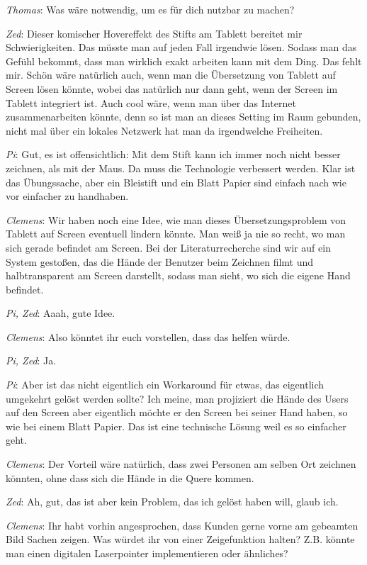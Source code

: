 \medskip \emph{Thomas}: Was wäre notwendig, um es für dich nutzbar zu machen?

\medskip \emph{Zed}: Dieser komischer Hovereffekt des Stifts am Tablett bereitet mir Schwierigkeiten. Das müsste man auf jeden Fall irgendwie lösen. Sodass man das Gefühl bekommt, dass man wirklich exakt arbeiten kann mit dem Ding. Das fehlt mir. Schön wäre natürlich auch, wenn man die Übersetzung von Tablett auf Screen lösen könnte, wobei das natürlich nur dann geht, wenn der Screen im Tablett integriert ist. Auch cool wäre, wenn man über das Internet zusammenarbeiten könnte, denn so ist man an dieses Setting im Raum gebunden, nicht mal über ein lokales Netzwerk hat man da irgendwelche Freiheiten.

\medskip \emph{Pi}: Gut, es ist offensichtlich: Mit dem Stift kann ich immer noch nicht besser zeichnen, als mit der Maus. Da muss die Technologie verbessert werden. Klar ist das Übungssache, aber ein Bleistift und ein Blatt Papier sind einfach nach wie vor einfacher zu handhaben.

\medskip \emph{Clemens}: Wir haben noch eine Idee, wie man dieses Übersetzungsproblem von Tablett auf Screen eventuell lindern könnte. Man weiß ja nie so recht, wo man sich gerade befindet am Screen. Bei der Literaturrecherche sind wir auf ein System gestoßen, das die Hände der Benutzer beim Zeichnen filmt und halbtransparent am Screen darstellt, sodass man sieht, wo sich die eigene Hand befindet.

\medskip \emph{Pi, Zed}: Aaah, gute Idee.

\medskip \emph{Clemens}: Also könntet ihr euch vorstellen, dass das helfen würde.

\medskip \emph{Pi, Zed}: Ja.

\medskip \emph{Pi}: Aber ist das nicht eigentlich ein Workaround für etwas, das eigentlich umgekehrt gelöst werden sollte? Ich meine, man projiziert die Hände des Users auf den Screen aber eigentlich möchte er den Screen bei seiner Hand haben, so wie bei einem Blatt Papier. Das ist eine technische Lösung weil es so einfacher geht.

\medskip \emph{Clemens}: Der Vorteil wäre natürlich, dass zwei Personen am selben Ort zeichnen könnten, ohne dass sich die Hände in die Quere kommen.

\medskip \emph{Zed}: Ah, gut, das ist aber kein Problem, das ich gelöst haben will, glaub ich.

\medskip \emph{Clemens}: Ihr habt vorhin angesprochen, dass Kunden gerne vorne am gebeamten Bild Sachen zeigen. Was würdet ihr von einer Zeigefunktion halten? Z.B. könnte man einen digitalen Laserpointer implementieren oder ähnliches?

